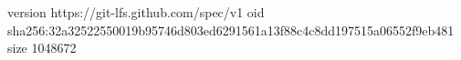 version https://git-lfs.github.com/spec/v1
oid sha256:32a32522550019b95746d803ed6291561a13f88c4c8dd197515a06552f9eb481
size 1048672
